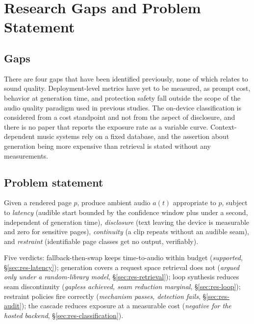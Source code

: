\documentclass[conference]{IEEEtran}
\begin{document}
\section{Research Gaps and Problem Statement}
\label{sec:gaps}

\subsection{Gaps}

There are four gaps that have been identified previously, none of which
relates to sound quality. Deployment-level metrics have yet to be measured, as
prompt cost, behavior at generation time, and protection safety fall outside
the scope of the audio quality paradigm used in previous studies. The
on-device classification is considered from a cost standpoint and not from the
aspect of disclosure, and there is no paper that reports the exposure rate as
a variable curve. Context-dependent music systems rely on a fixed database,
and the assertion about generation being more expensive than retrieval is
stated without any measurements.

\subsection{Problem statement}

Given a rendered page $p$, produce ambient audio $a(t)$ appropriate to
$p$, subject to \emph{latency} (audible start bounded by the confidence
window plus under a second, independent of generation time),
\emph{disclosure} (text leaving the device is measurable and zero for
sensitive pages), \emph{continuity} (a clip repeats without an audible
seam), and \emph{restraint} (identifiable page classes get no output,
verifiably).

Five verdicts: fallback-then-swap keeps time-to-audio within budget
(\emph{supported}, \S\ref{sec:res-latency}); generation covers a request
space retrieval does not (\emph{argued only under a random-library model},
\S\ref{sec:res-retrieval}); loop synthesis reduces seam discontinuity
(\emph{gapless achieved, seam reduction marginal}, \S\ref{sec:res-loop});
restraint policies fire correctly (\emph{mechanism passes, detection
fails}, \S\ref{sec:res-audit}); the cascade reduces exposure at a
measurable cost (\emph{negative for the hosted backend},
\S\ref{sec:res-classification}).
\end{document}
